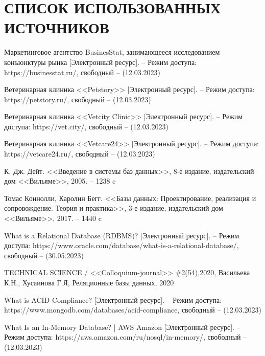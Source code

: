 \section*{СПИСОК ИСПОЛЬЗОВАННЫХ ИСТОЧНИКОВ}

\begingroup
\renewcommand{\section}[2]{}
\begin{thebibliography}{}
	
		Маркетинговое агентство  BusinesStat, занимающееся исследованием конъюнктуры рынка [Электронный ресурс]. -- Режим доступа: 
		https://businesstat.ru/,
		свободный -- (12.03.2023)
		
		Ветеринарная клиника <<Petstory>> [Электронный ресурс]. -- Режим доступа:  https://petstory.ru/,
		свободный -- (12.03.2023)
		
		Ветеринарная клиника <<Vetcity Clinic>> [Электронный ресурс]. -- Режим доступа:  https://vet.city/,
		свободный -- (12.03.2023)
		
		Ветеринарная клиника <<Vetcare24>> [Электронный ресурс]. -- Режим доступа: https://vetcare24.ru/,
		свободный -- (12.03.2023)
			
		К. Дж. Дейт.
		<<Введение в системы баз данных>>, 8-е издание, издательский дом <<Вильяме>>,
		2005. -- 1238 c 
		
		Томас Коннолли, Каролин Бегг.
		<<Базы данных: Проектирование, реализация и сопровождение. Теория и практика>>, 3-е издание, издательский дом <<Вильяме>>,
		2017. -- 1440 c
		
		
		What is a Relational Database (RDBMS)? [Электронный ресурс]. -- Режим доступа: https://www.oracle.com/database/what-is-a-relational-database/, свободный -- (30.05.2023)
		

		TECHNICAL SCIENCE / <<Colloquium-journal>> \#2(54),2020,
		Васильева К.Н., Хусаинова Г.Я,
		Реляционные базы данных,
		2020

		What is ACID Compliance? [Электронный ресурс]. -- Режим доступа: 	https://www.mongodb.com/databases/acid-compliance,
		свободный -- (12.03.2023)
		
		What Is an In-Memory Database? | AWS Amazon [Электронный ресурс]. -- Режим доступа: https://aws.amazon.com/ru/nosql/in-memory/,
		свободный -- (12.03.2023)
		

\end{thebibliography}
